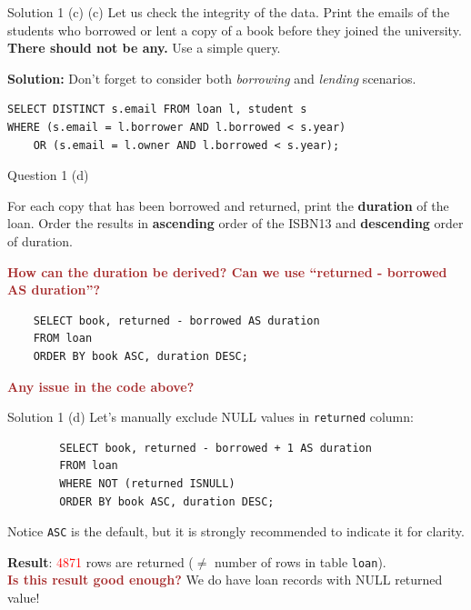 \begin{frame}[fragile]{Solution 1 (c)}
(c) Let us check the integrity of the data. Print the emails of the students who borrowed or lent a copy of a book before they joined the university. \textbf{There should not be any.} Use a simple query.\\\vspace{10pt}

\textbf{Solution:} Don't forget to consider both \textit{borrowing} and \textit{lending} scenarios.\\

\begin{lstlisting}
SELECT DISTINCT s.email FROM loan l, student s 
WHERE (s.email = l.borrower AND l.borrowed < s.year) 
	OR (s.email = l.owner AND l.borrowed < s.year);
\end{lstlisting}
\end{frame}


\begin{frame}[fragile]{Question 1 (d)}

For each copy that has been borrowed and returned, print the \textbf{duration} of the loan. Order the results in \textbf{ascending} order of the ISBN13 and \textbf{descending} order of duration.  \\ \vspace{15pt}

\textcolor{brown}{\textbf{How can the duration be derived? Can we use ``returned - borrowed AS duration''?}}\\ \vspace{5pt}

\begin{lstlisting}
	SELECT book, returned - borrowed AS duration 
	FROM loan
	ORDER BY book ASC, duration DESC;
\end{lstlisting}

\textcolor{brown}{\textbf{Any issue in the code above?}}
\end{frame}

\begin{frame}[fragile]{Solution 1 (d)}
	Let's manually exclude NULL values in \texttt{returned} column:\\
	\begin{lstlisting}
		SELECT book, returned - borrowed + 1 AS duration 
		FROM loan
		WHERE NOT (returned ISNULL)
		ORDER BY book ASC, duration DESC;
	\end{lstlisting}

\begin{block}{Notice}
\texttt{ASC} is the default, but it is strongly recommended to indicate it for clarity.
\end{block}	

\textbf{Result}: \textcolor{red}{4871} rows are returned ($\neq$ number of rows in table \texttt{loan}).\\\vspace{10pt}
\textcolor{brown}{\textbf{Is this result good enough?}} We do have loan records with NULL returned value!
	
\end{frame}

